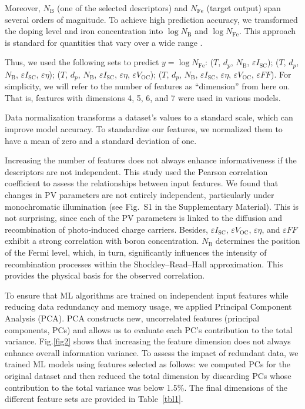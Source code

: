 \documentclass[a4paper,fleqn]{cas-sc}
\begin{document}
Moreover, $N_\mathrm{B}$ (one of the selected descriptors) and
$N_\mathrm{Fe}$ (target output) span several orders of magnitude.
To achieve high prediction accuracy, we transformed the doping level and iron concentration into
$\log N_\mathrm{B}$ and $\log N_\mathrm{Fe}$.
This approach is standard for quantities that vary over a wide range \cite{Srivastava2023, Minagawa2024}.

Thus, we used the following sets to predict $y = \log N_\mathrm{Fe}$:
($T$, $d_p$, $N_\mathrm{B}$, $\varepsilon I_\mathrm{SC}$);
($T$, $d_p$, $N_\mathrm{B}$, $\varepsilon I_\mathrm{SC}$, $\varepsilon \eta$);
($T$, $d_p$, $N_\mathrm{B}$, $\varepsilon I_\mathrm{SC}$, $\varepsilon \eta$, $\varepsilon V_\mathrm{OC}$);
($T$, $d_p$, $N_\mathrm{B}$, $\varepsilon I_\mathrm{SC}$, $\varepsilon \eta$, $\varepsilon V_\mathrm{OC}$, $\varepsilon F\!F$).
For simplicity, we will refer to the number of features as ``dimension'' from here on.
That is, features with dimensions 4, 5, 6, and 7 were used in various models.

Data normalization transforms a dataset's values to a standard scale, which can improve model accuracy.
To standardize our features, we normalized them to have a mean of zero and a standard deviation of one.

Increasing the number of features does not always enhance informativeness if the descriptors are not independent.
This study used the Pearson correlation coefficient to assess the relationships between input features.
We found that changes in PV parameters are not entirely independent, particularly under monochromatic illumination
(see Fig.~S1 in the Supplementary Material).
This is not surprising, since each of the PV parameters is linked to the diffusion and recombination of photo-induced charge carriers.
Besides,
$\varepsilon I_\mathrm{SC}$, $\varepsilon V_\mathrm{OC}$, $\varepsilon \eta$, and $\varepsilon F\!F$
exhibit a strong correlation with boron concentration.
$N_\mathrm{B}$ determines the position of the Fermi level, which, in turn, significantly influences
the intensity of recombination processes within the Shockley–Read–Hall approximation.
This provides the physical basis for the observed correlation.

To ensure that ML algorithms are trained on independent input features while reducing data redundancy and memory usage,
we applied Principal Component Analysis (PCA).
PCA constructs new, uncorrelated features (principal components, PCs) and allows us to evaluate each PC's contribution to the total variance.
Fig.\ref{fig2} shows that increasing the feature dimension does not always enhance overall information variance.
To assess the impact of redundant data, we trained ML models using features selected as follows:
we computed PCs for the original dataset and then reduced the total dimension
by discarding PCs whose contribution to the total variance was below 1.5\%.
The final dimensions of the different feature sets are provided in Table~\ref{tbl1}.
\end{document}
